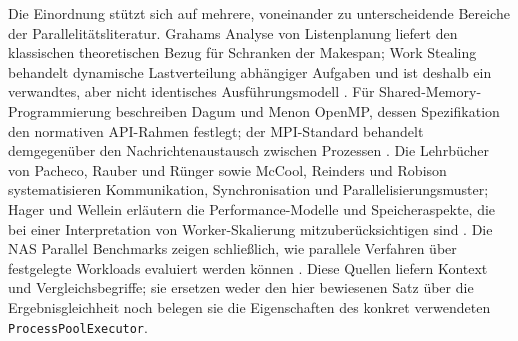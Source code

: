 \documentclass[a4paper,12pt, twoside]{report}
\theoremstyle{definition}
\begin{document}
Die Einordnung stützt sich auf mehrere, voneinander zu unterscheidende Bereiche der Parallelitätsliteratur. Grahams Analyse von Listenplanung liefert den klassischen theoretischen Bezug für Schranken der Makespan; Work Stealing behandelt dynamische Lastverteilung abhängiger Aufgaben und ist deshalb ein verwandtes, aber nicht identisches Ausführungsmodell \cite{graham1969,blumofe1999workstealing}. Für Shared-Memory-Programmierung beschreiben Dagum und Menon OpenMP, dessen Spezifikation den normativen API-Rahmen festlegt; der MPI-Standard behandelt demgegenüber den Nachrichtenaustausch zwischen Prozessen \cite{dagum1998openmp,openmp52,mpi41standard}. Die Lehrbücher von Pacheco, Rauber und Rünger sowie McCool, Reinders und Robison systematisieren Kommunikation, Synchronisation und Parallelisierungsmuster; Hager und Wellein erläutern die Performance-Modelle und Speicheraspekte, die bei einer Interpretation von Worker-Skalierung mitzuberücksichtigen sind \cite{pacheco2011parallel,rauber2013parallel,mccool2012structuredparallel,hager2010hpc}. Die NAS Parallel Benchmarks zeigen schließlich, wie parallele Verfahren über festgelegte Workloads evaluiert werden können \cite{bailey1991nas}. Diese Quellen liefern Kontext und Vergleichsbegriffe; sie ersetzen weder den hier bewiesenen Satz über die Ergebnisgleichheit noch belegen sie die Eigenschaften des konkret verwendeten \texttt{ProcessPoolExecutor}.
\end{document}
